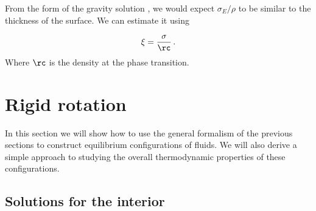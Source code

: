 From the form of the gravity solution , we would expect $\sigma_E/\rho$ to be similar to the thickness of the surface. We can estimate it using

\begin{equation}\label{thick:eq}
  \xi = \frac{\sigma}{\rc} %
  \,.
\end{equation}
%
Where $\rc$ is the density at the phase transition. %



\section{Rigid rotation}\label{sec:rigidrot}

In this section we will show how to use the general formalism of the previous sections to construct equilibrium configurations of fluids.  We will also derive a simple approach to studying the overall thermodynamic properties of these configurations.



\subsection{Solutions for the interior}\label{sec:rotint}

